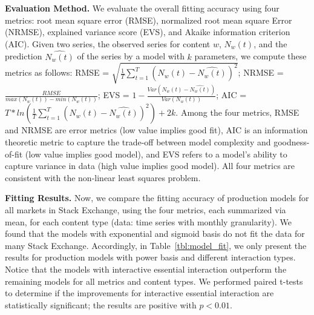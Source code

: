 \textbf{Evaluation Method.} We evaluate the overall fitting accuracy using four metrics: root mean square error (RMSE), normalized root mean square Error (NRMSE), explained variance score (EVS), and Akaike information criterion (AIC). Given two series, the observed series for content $w$, $N_w(t)$, and the prediction $\hat{N_w(t)}$ of the series by a model with $k$ parameters, we compute these metrics as follows: RMSE = $\sqrt{\frac{1}{T}\sum_{t=1}^{T}(N_w(t)-\hat{N_w(t)})^2}$; NRMSE = $\frac{RMSE}{max(N_w(t))-min(N_w(t))}$; EVS = $1-\frac{Var(N_w(t)-\hat{N_w(t)})}{Var(N_w(t))}$; AIC = $T*ln(\frac{1}{T}\sum_{t=1}^{T}(N_w(t)-\hat{N_w(t)})^2)+2k$. Among the four metrics, RMSE and NRMSE are error metrics (low value implies good fit), AIC is an information theoretic metric to capture the trade-off between model complexity and goodness-of-fit (low value implies good model), and EVS refers to a model's ability to capture variance in data (high value implies good model). All four metrics are consistent with the non-linear least squares problem. 

\textbf{Fitting Results.} Now, we compare the fitting accuracy of production models for all markets in Stack Exchange, using the four metrics, each summarized via mean, for each content type (data: time series with monthly granularity). We found that the models with exponential and sigmoid basis do not fit the data for many Stack Exchange. Accordingly, in Table~\ref{tbl:model_fit}, we only present the results for production models with power basis and different interaction types. Notice that the models with interactive essential interaction outperform the remaining models for all metrics and content types. We performed paired t-tests to determine if the improvements for interactive essential interaction are statistically significant; the results are positive with $p<0.01$.

